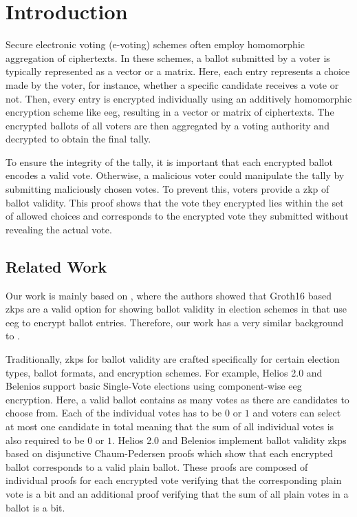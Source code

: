 \chapter{Introduction}

Secure electronic voting (e-voting) schemes often employ homomorphic aggregation of ciphertexts.
In these schemes, a ballot submitted by a voter is typically represented as a vector or a matrix.
Here, each entry represents a choice made by the voter, for instance, whether a specific candidate receives a vote or not.
Then, every entry is encrypted individually using an additively homomorphic encryption scheme like \gls{eeg}, resulting in a vector or matrix of ciphertexts. 
The encrypted ballots of all voters are then aggregated by a voting authority and decrypted to obtain the final tally.

To ensure the integrity of the tally, it is important that each encrypted ballot encodes a valid vote. 
Otherwise, a malicious voter could manipulate the tally by submitting maliciously chosen votes. 
To prevent this, voters provide a \gls{zkp} of ballot validity.
This proof shows that the vote they encrypted lies within the set of allowed choices and corresponds to the encrypted vote they submitted without revealing the actual vote.

\section*{Related Work}
Our work is mainly based on \cite{huber_zk-snarks_2025}, where the authors showed that Groth16 based \glspl{zkp} are a valid option for showing ballot validity in election schemes in that use \gls{eeg} to encrypt ballot entries.
Therefore, our work has a very similar background to \cite{huber_zk-snarks_2025}.

Traditionally, \glspl{zkp} for ballot validity are crafted specifically for certain election types, ballot formats, and encryption schemes. 
For example, Helios 2.0 \cite{adida_electing_2009} and Belenios \cite{cortier_belenios_2019,gaudry_zk_2017} support basic Single-Vote elections using component-wise \gls{eeg} encryption.
Here, a valid ballot contains as many votes as there are candidates to choose from. 
Each of the individual votes has to be $0$ or $1$ and voters can select at most one candidate in total meaning that the sum of all individual votes is also required to be $0$ or $1$.
Helios 2.0 and Belenios implement ballot validity \glspl{zkp} based on disjunctive Chaum-Pedersen proofs \cite{chaum_wallet_1993,desmedt_proofs_1994} which show that each encrypted ballot corresponds to a valid plain ballot. 
These proofs are composed of individual proofs for each encrypted vote verifying that the corresponding plain vote is a bit and an additional proof verifying that the sum of all plain votes in a ballot is a bit.

